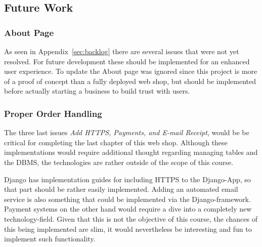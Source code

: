 \subsection{Future Work} 

\subsubsection{About Page}\label{sec:about}

As seen in Appendix~\ref{sec:backlog} there are several issues that were
not yet resolved. For future development these should be implemented for
an enhanced user experience. To update the About page was ignored since
this project is more of a proof of concept than a fully deployed web shop, but
should be implemented before actually starting a business to build trust with
users.



\subsubsection{Proper Order Handling}\label{sec:security}

The three last issues \textit{Add HTTPS, Payments, and E-mail Receipt}, would
be be critical for completing the last chapter of this web shop. Although these
implementations would require additional thought regarding managing tables
and the DBMS, the technologies are rather outside of the scope of this course.

Django has implementation guides for including HTTPS to the Django-App,
so that part should be rather easily implemented. Adding an automated email
service is also something that could be implemented via the Django-framework.
Payment systems on the other hand would require a dive into a completely
new technology-field. Given that this is not the objective of this course,
the chances of this being implemented are slim, it would nevertheless be
interesting and fun to implement such functionality.
